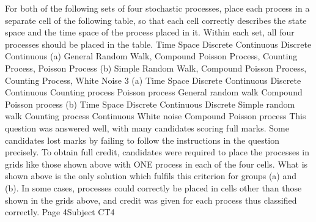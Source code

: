 \documentclass[a4paper,12pt]{article}
\begin{document}
For both of the following sets of four stochastic processes, place each process in a
separate cell of the following table, so that each cell correctly describes the state space
and the time space of the process placed in it. Within each set, all four processes
should be placed in the table.
Time Space
Discrete
Continuous
Discrete
Continuous
(a) General Random Walk, Compound Poisson Process, Counting Process,
Poisson Process
(b) Simple Random Walk, Compound Poisson Process, Counting Process,
White Noise
3
(a)
Time Space
Discrete
Continuous
Discrete
Continuous
Counting
process Poisson
process
General
random walk Compound
Poisson process
(b)
Time Space
Discrete
Continuous
Discrete Simple
random walk Counting
process
Continuous White noise Compound
Poisson process
This question was answered well, with many candidates scoring full marks. Some candidates
lost marks by failing to follow the instructions in the question precisely. To obtain full credit,
candidates were required to place the processes in grids like those shown above with ONE
process in each of the four cells. What is shown above is the only solution which fulfils this
criterion for groups (a) and (b). In some cases, processes could correctly be placed in cells
other than those shown in the grids above, and credit was given for each process thus
classified correctly.
Page 4Subject CT4 %
\end{document}
